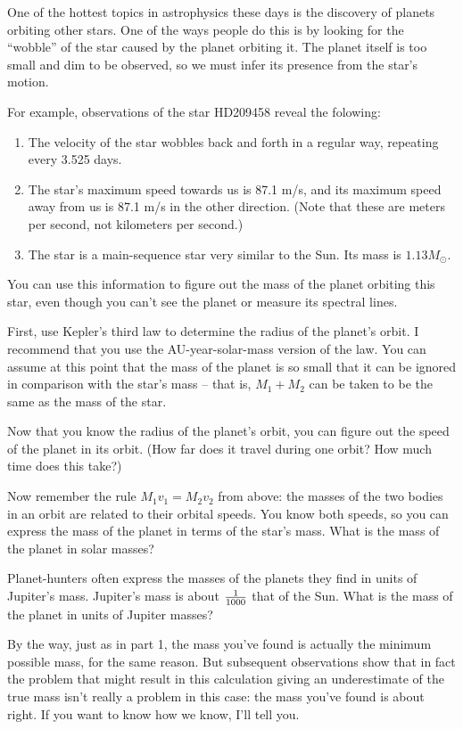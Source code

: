 One of the hottest topics in astrophysics these days is the discovery
of planets orbiting other stars. One of the ways people do this is
by looking for the ``wobble'' of the star caused by the planet
orbiting it. The planet itself is too small and dim to be observed,
so we must infer its presence from the star's motion.

For example, observations of the star HD209458 reveal the folowing:
\begin{enumerate}
\item The
velocity of the star wobbles back and forth in a regular way, repeating
every 3.525 days. 
\item The star's maximum speed towards us is 87.1 m/s,
and its maximum speed away from us is 87.1 m/s in the other direction.
(Note that these are meters per second, not kilometers per second.)
\item The star is a main-sequence star very similar to the Sun.
Its mass is $1.13M_\odot$.
\end{enumerate}

You can use this information to figure out the mass of the planet
orbiting this star, even though you can't see the planet or measure
its spectral lines.

First, use Kepler's third law to determine the radius of the
planet's orbit. I recommend that you use the AU-year-solar-mass
version of the law. You can assume at this point that the
mass of the planet is so small that it can be ignored in comparison
with the star's mass -- that is, $M_1+M_2$ can be taken to be the
same as the mass of the star.

\vfil\eject

Now that you know the radius of the planet's orbit, you can figure out
the speed of the planet in its orbit. (How far does it travel during
one orbit? How much time does this take?)

\vskip 2in

Now remember the rule $M_1v_1=M_2v_2$ from above: the masses of the two
bodies in an orbit are related to their orbital speeds. You know both
speeds, so you can express the mass of the planet in terms of the
star's mass. What is the mass of the planet in solar masses?

\vskip 2in

Planet-hunters often express the masses of the planets they find
in units of Jupiter's mass. Jupiter's mass is about $1\over 1000$
that of the Sun. What is the mass of the planet in units of Jupiter masses?

\vskip 1in

By the way, just as in part 1, the mass you've found is actually
the minimum possible mass, for the same reason. But subsequent
observations show that in fact the problem that might result
in this calculation giving an underestimate of the true mass
isn't really a problem in this case: the mass you've found is about right.
If you want to know how we know, I'll tell you.


